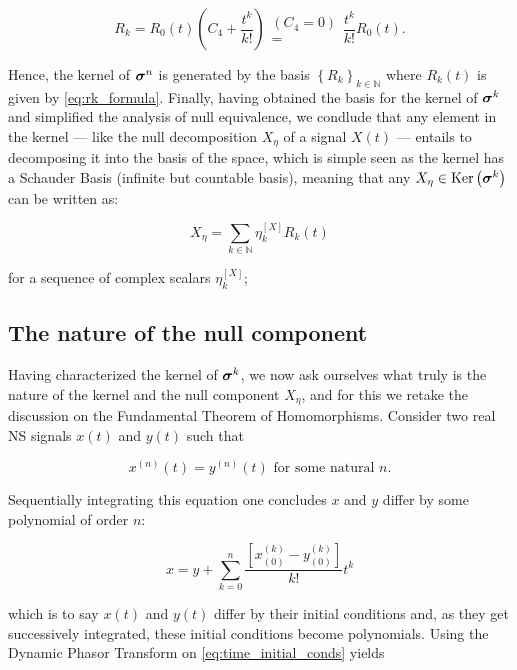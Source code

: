 \begin{equation} R_{k} = R_0(t)\left(C_4 + \dfrac{t^{k}}{k!}\right) \substack{(C_4 = 0)\\ =} \dfrac{t^k}{k!} R_0(t) . \label{eq:rk_formula}\end{equation}

	Hence, the kernel of $\boldsymbol{\sigma}^{n}$ is generated by the basis $\left\{R_k\right\}_{k\in\mathbb{N}}$ where $R_k(t)$ is given by \eqref{eq:rk_formula}. Finally, having obtained the basis for the kernel of $\boldsymbol{\sigma}^{k}$ and simplified the analysis of null equivalence, we condlude that any element in the kernel — like the null decomposition $X_\eta$ of a signal $X(t)$ — entails to decomposing it into the basis of the space, which is simple seen as the kernel has a Schauder Basis (infinite but countable basis), meaning that any $X_\eta\in\operatorname{Ker}\left(\boldsymbol{\sigma}^{k}\right)$ can be written as:

\begin{equation} X_\eta = \sum_{k\in\mathbb{N}} \eta_k^{\left[X\right]} R_k(t) \end{equation}

	\noindent for a sequence of complex scalars $\eta_k^{\left[X\right]}$; 

\subsection{The nature of the null component} %

	Having characterized the kernel of $\boldsymbol{\sigma}^{k}$, we now ask ourselves what truly is the nature of the kernel and the null component $X_\eta$, and for this we retake the discussion on the Fundamental Theorem of Homomorphisms. Consider two real NS signals $x(t)$ and $y(t)$ such that

\begin{equation} x^{(n)}(t) = y^{(n)}(t) \text{ for some natural } n.\end{equation}

	Sequentially integrating this equation one concludes $x$ and $y$ differ by some polynomial of order $n$:

\begin{equation} x = y + \sum_{k=0}^{n} \dfrac{\left[x_{(0)}^{(k)} - y_{(0)}^{(k)}\right]}{k!} t^k \label{eq:time_initial_conds}\end{equation}

	\noindent which is to say $x(t)$ and $y(t)$ differ by their initial conditions and, as they get successively integrated, these initial conditions become polynomials. Using the Dynamic Phasor Transform on \eqref{eq:time_initial_conds} yields

